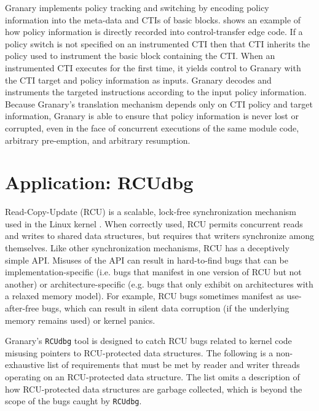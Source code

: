\documentclass[preprint]{sigplanconf}
\begin{document}
Granary implements policy tracking and switching by encoding policy information into the meta-data and CTIs of basic blocks.  shows an example of how policy information is directly recorded into control-transfer edge code. If a policy switch is not specified on an instrumented CTI then that CTI inherits the policy used to instrument the basic block containing the CTI. When an instrumented CTI executes for the first time, it yields control to Granary with the CTI target and policy information as inputs. Granary decodes and instruments the targeted instructions according to the input policy information. Because Granary's translation mechanism depends only on CTI policy and target information, Granary is able to ensure that policy information is never lost or corrupted, even in the face of concurrent executions of the same module code, arbitrary pre-emption, and arbitrary resumption.




\section{Application: RCUdbg}

Read-Copy-Update (RCU) is a scalable, lock-free synchronization mechanism used in the Linux kernel \cite{RCU,RCUInLinux}. When correctly used, RCU permits concurrent reads and writes to shared data structures, but requires that writers synchronize among themselves. Like other synchronization mechanisms, RCU has a deceptively simple API. Misuses of the API can result in hard-to-find bugs that can be implementation-specific (i.e. bugs that manifest in one version of RCU but not another) or architecture-specific (e.g. bugs that only exhibit on architectures with a relaxed memory model). For example, RCU bugs sometimes manifest as use-after-free bugs, which can result in silent data corruption (if the underlying memory remains used) or kernel panics. 




Granary's \texttt{RCUdbg} tool is designed to catch RCU bugs related to kernel code misusing pointers to RCU-protected data structures. The following is a non-exhaustive list of requirements that must be met by reader and writer threads operating on an RCU-protected data structure. The list omits a description of how RCU-protected data structures are garbage collected, which is beyond the scope of the bugs caught by \texttt{RCUdbg}.
\end{document}
